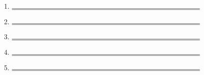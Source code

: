\newpage
\begin{center}
  \begin{goals}[width=0.9\textwidth,]
    \begin{enumerate}
      \item $\rule{0.8\textwidth}{0.15mm}$ $\rule{0.8\textwidth}{0.15mm}$
      \item $\rule{0.8\textwidth}{0.15mm}$ $\rule{0.8\textwidth}{0.15mm}$
      \item $\rule{0.8\textwidth}{0.15mm}$ $\rule{0.8\textwidth}{0.15mm}$
      \item $\rule{0.8\textwidth}{0.15mm}$ $\rule{0.8\textwidth}{0.15mm}$
      \item $\rule{0.8\textwidth}{0.15mm}$ $\rule{0.8\textwidth}{0.15mm}$
    \end{enumerate}
  \end{goals}
\end{center}
